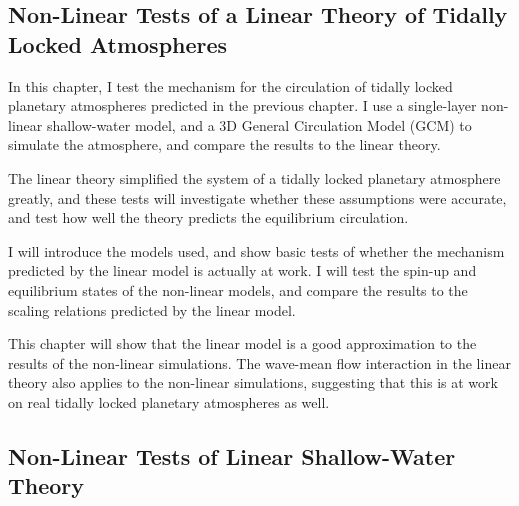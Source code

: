 \begin{SingleSpace}
\chapter{Non-Linear Tests of a Linear Theory of Tidally Locked Atmospheres}
\vspace{0.5cm}
\end{SingleSpace}
\vspace{0.5cm}





In this chapter, I test the mechanism for the circulation of tidally locked planetary atmospheres predicted in the previous chapter. I use a single-layer non-linear shallow-water model, and a 3D General Circulation Model (GCM) to simulate the atmosphere, and compare the results to the linear theory.


The linear theory simplified the system of a tidally locked planetary atmosphere greatly, and these tests will investigate whether these assumptions were accurate, and test how well the theory predicts the equilibrium circulation.


I will introduce the models used, and show basic tests of whether the mechanism predicted by the linear model is actually at work. I will test the spin-up and equilibrium states of the non-linear models, and compare the results to the scaling relations predicted by the linear model.


This chapter will show that the linear model is a good approximation to the results of the non-linear simulations. The wave-mean flow interaction in the linear theory also applies to the non-linear simulations, suggesting that this is at work on real tidally locked planetary atmospheres as well.



\section{Non-Linear Tests of Linear Shallow-Water Theory}

